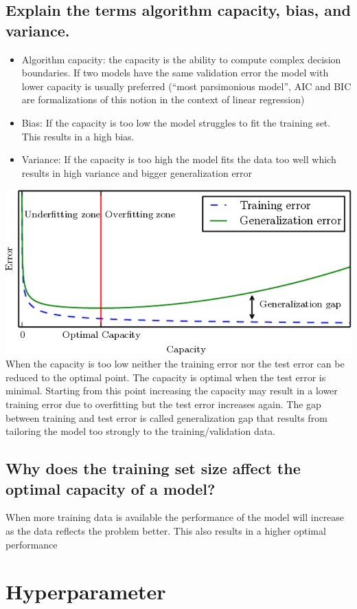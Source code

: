 \subsection{Explain the terms algorithm capacity, bias, and variance.}
\begin{itemize}
\item Algorithm capacity: the capacity is the ability to compute complex decision boundaries. If two models have the same validation error the model with lower capacity is usually preferred (``most parsimonious model'', AIC and BIC are formalizations of this notion in the context of linear regression)
\item Bias: If the capacity is too low the model struggles to fit the training set. This results in a high bias. 
\item Variance: If the capacity is too high the model fits the data too well which results in high variance and bigger generalization error
\end{itemize}
\includegraphics[width=\textwidth]{./img/capacity.jpeg}
When the capacity is too low neither the training error nor the test error can be reduced to the optimal point. The capacity is optimal when the test error is minimal. Starting from this point increasing the capacity may result in a lower training error due to overfitting but the test error increases again. The gap between training and test error is called generalization gap that results from tailoring the model too strongly to the training/validation data.
\subsection{Why does the training set size affect the optimal capacity of a model?}
When more training data is available the performance of the model will increase as the data reflects the problem better. This also results in a higher optimal performance
%
\section{Hyperparameter}
